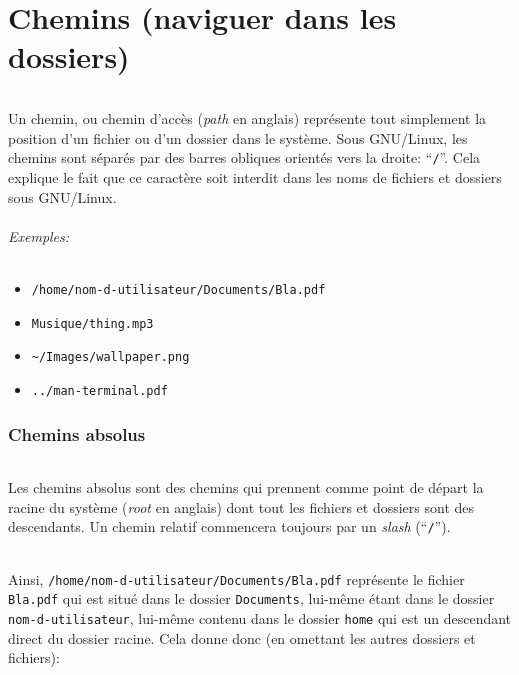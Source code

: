 \documentclass[french, a4paper, 12pt, titlepage]{article}
\begin{document}
\newpage
\part{Chemins (naviguer dans les dossiers)}

\paragraph{} Un chemin, ou chemin d'accès (\emph{path} en anglais) représente
tout simplement la position d'un fichier ou d'un dossier dans le système. Sous
GNU/Linux, les chemins sont séparés par des barres obliques orientés vers la
droite: ``\texttt{/}''.  Cela explique le fait que ce caractère soit interdit
dans les noms de fichiers et dossiers sous GNU/Linux.

\paragraph{Exemples:}

\begin{itemize}
	\item \texttt{/home/nom-d-utilisateur/Documents/Bla.pdf}
	\item \texttt{Musique/thing.mp3}
	\item \texttt{\~{}/Images/wallpaper.png}
	\item \texttt{../man-terminal.pdf}
\end{itemize}

\section{Chemins absolus}

\paragraph{} Les chemins absolus sont des chemins qui prennent comme point de
départ la racine du système (\emph{root} en anglais) dont tout les fichiers et
dossiers sont des descendants. Un chemin relatif commencera toujours par un
\emph{slash} (``\texttt{/}'').

\paragraph{} Ainsi, \texttt{/home/nom-d-utilisateur/Documents/Bla.pdf}
représente le fichier \texttt{Bla.pdf} qui est situé dans le dossier
\texttt{Documents}, lui-même étant dans le dossier \texttt{nom-d-utilisateur},
lui-même contenu dans le dossier \texttt{home} qui est un descendant direct du
dossier racine. Cela donne donc (en omettant les autres dossiers et fichiers):
\\
\end{document}
